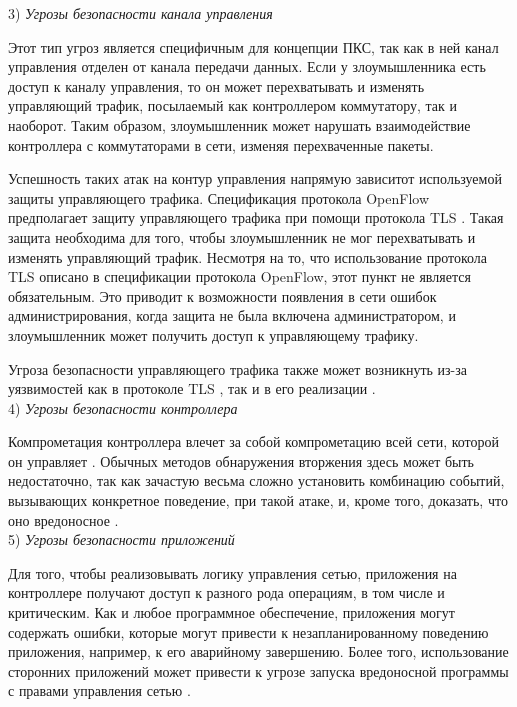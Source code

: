 \documentclass[../thesis.tex]{subfiles}
\begin{document}
3) \textit{Угрозы безопасности канала управления}

Этот тип угроз является специфичным для концепции ПКС, так как в ней канал управления отделен от канала передачи данных.
Если у злоумышленника есть доступ к каналу управления, то он может перехватывать и изменять управляющий трафик, посылаемый как контроллером коммутатору, так и наоборот.
Таким образом, злоумышленник может нарушать взаимодействие контроллера с коммутаторами в сети, изменяя перехваченные пакеты.

Успешность таких атак на контур управления напрямую зависит\linebreak от используемой защиты управляющего трафика.
Спецификация протокола OpenFlow \cite{openflow15} предполагает защиту управляющего трафика при помощи протокола TLS \cite{turner2014transport}.
Такая защита необходима для того, чтобы злоумышленник не мог перехватывать и изменять управляющий трафик.
Несмотря на то, что использование протокола TLS описано в спецификации протокола OpenFlow, этот пункт не является обязательным.
Это приводит к возможности появления в сети ошибок администрирования, когда защита не была включена администратором, и злоумышленник может получить доступ к управляющему трафику.

Угроза безопасности управляющего трафика также может возникнуть из-за уязвимостей как в протоколе TLS \cite{sheffer2015summarizing, meyer2013lessons}, так и в его реализации \cite{durumeric2014matter}.
\\

4) \textit{Угрозы безопасности контроллера}

Компрометация контроллера влечет за собой компрометацию всей сети, которой он управляет \cite{scott2013sdn}.
Обычных методов обнаружения вторжения здесь может быть недостаточно, так как зачастую весьма сложно установить комбинацию событий, вызывающих конкретное поведение, при такой атаке, и, кроме того, доказать, что оно вредоносное \cite{wang2018towards}.
\\

5) \textit{Угрозы безопасности приложений}

Для того, чтобы реализовывать логику управления сетью, приложения на контроллере получают доступ к разного рода операциям, в том числе и критическим.
Как и любое программное обеспечение, приложения могут содержать ошибки, которые могут привести к незапланированному поведению приложения, например, к его аварийному завершению.
Более того, использование сторонних приложений может привести к угрозе запуска вредоносной программы с правами управления сетью \cite{shin2014rosemary}.
\\
\end{document}
